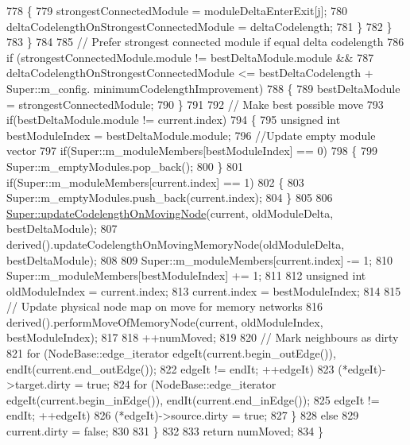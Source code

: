 \begin{DoxyCode}
778                 \{
779                     strongestConnectedModule = moduleDeltaEnterExit[j];
780                     deltaCodelengthOnStrongestConnectedModule = deltaCodelength;
781                 \}
782             \}
783         \}
784 
785         \textcolor{comment}{// Prefer strongest connected module if equal delta codelength}
786         \textcolor{keywordflow}{if} (strongestConnectedModule.module != bestDeltaModule.module &&
787                 deltaCodelengthOnStrongestConnectedModule <= bestDeltaCodelength + Super::m\_config.
      minimumCodelengthImprovement)
788         \{
789             bestDeltaModule = strongestConnectedModule;
790         \}
791 
792         \textcolor{comment}{// Make best possible move}
793         \textcolor{keywordflow}{if}(bestDeltaModule.module != current.index)
794         \{
795             \textcolor{keywordtype}{unsigned} \textcolor{keywordtype}{int} bestModuleIndex = bestDeltaModule.module;
796             \textcolor{comment}{//Update empty module vector}
797             \textcolor{keywordflow}{if}(Super::m\_moduleMembers[bestModuleIndex] == 0)
798             \{
799                 Super::m\_emptyModules.pop\_back();
800             \}
801             \textcolor{keywordflow}{if}(Super::m\_moduleMembers[current.index] == 1)
802             \{
803                 Super::m\_emptyModules.push\_back(current.index);
804             \}
805 
806             \mbox{\hyperlink{classInfomapGreedySpecialized_a6f4ff75d89a26f1b474ca5a2190878c7}{Super::updateCodelengthOnMovingNode}}(current, oldModuleDelta,
       bestDeltaModule);
807             derived().updateCodelengthOnMovingMemoryNode(oldModuleDelta, bestDeltaModule);
808 
809             Super::m\_moduleMembers[current.index] -= 1;
810             Super::m\_moduleMembers[bestModuleIndex] += 1;
811 
812             \textcolor{keywordtype}{unsigned} \textcolor{keywordtype}{int} oldModuleIndex = current.index;
813             current.index = bestModuleIndex;
814 
815             \textcolor{comment}{// Update physical node map on move for memory networks}
816             derived().performMoveOfMemoryNode(current, oldModuleIndex, bestModuleIndex);
817 
818             ++numMoved;
819 
820             \textcolor{comment}{// Mark neighbours as dirty}
821             \textcolor{keywordflow}{for} (NodeBase::edge\_iterator edgeIt(current.begin\_outEdge()), endIt(current.end\_outEdge());
822                     edgeIt != endIt; ++edgeIt)
823                 (*edgeIt)->target.dirty = \textcolor{keyword}{true};
824             for (NodeBase::edge\_iterator edgeIt(current.begin\_inEdge()), endIt(current.end\_inEdge());
825                     edgeIt != endIt; ++edgeIt)
826                 (*edgeIt)->source.dirty = \textcolor{keyword}{true};
827         \}
828         \textcolor{keywordflow}{else}
829             current.dirty = \textcolor{keyword}{false};
830 
831     \}
832 
833     \textcolor{keywordflow}{return} numMoved;
834 \}
\end{DoxyCode}
